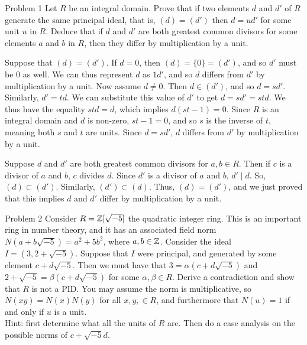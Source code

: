 \documentclass{hmwk}
\begin{document}
\maketitle

\begin{problem}{Problem 1}
Let $R$ be an integral domain. Prove that if two elements $d$ and $d'$ of $R$ generate the same principal ideal, that is, $(d) = (d')$ then $d = ud'$ for some unit $u$ in $R$. Deduce that if $d$ and $d'$ are both greatest common divisors for some elements $a$ and $b$ in $R$, then they differ by multiplication by a unit.
\end{problem}

\begin{solution}

\pre Suppose that $(d) = (d')$. If $d = 0$, then $(d) = \{0\} = (d')$, and so $d'$ must be $0$ as well. We can thus represent $d$ as $1d'$, and so $d$ differs from $d'$ by multiplication by a unit. Now assume $d \neq 0$. Then $d \in (d')$, and so $d = sd'$. Similarly, $d' = td$. We can substitute this value of $d'$ to get $d = sd' = std$. We thus have the equality $std = d$, which implies $d(st - 1) = 0$. Since $R$ is an integral domain and $d$ is non-zero, $st - 1 = 0$, and so $s$ is the inverse of $t$, meaning both $s$ and $t$ are units. Since $d = sd'$, $d$ differs from $d'$ by multiplication by a unit. 

\pre Suppose $d$ and $d'$ are both greatest common divisors for $a, b \in R$. Then if $c$ is a divisor of $a$ and $b$, $c$ divides $d$. Since $d'$ is a divisor of $a$ and $b$, $d' \mid d$. So, $(d) \subset (d')$. Similarly, $(d') \subset (d)$. Thus, $(d) = (d')$, and we just proved that this implies $d$ and $d'$ differ by multiplication by a unit.

\end{solution}

\begin{problem}{Problem 2}
Consider $R = \mathbb{Z}[\sqrt{-5}]$ the quadratic integer ring. This is an important ring in number theory, and it has an associated field norm $N(a+b\sqrt{-5}) = a^2+5 b^2$, where $a, b \in \mathbb{Z}$.  Consider the ideal $I = (3, 2+ \sqrt{-5})$. Suppose that $I$ were principal, and generated by some element $c+d\sqrt{-5}$. 
Then we must have that $3= \alpha (c+d\sqrt{-5})$ and $2+\sqrt{-5} = \beta(c+d \sqrt{-5})$ for some $\alpha, \beta \in R$. 
Derive a contradiction and show that $R$ is not a PID.
You may assume the norm is multiplicative, so $N(xy) = N(x)N(y)$ for all $x, y, \in R$, and furthermore that $N(u) = 1$ if and only if $u$ is a unit. 
\\ Hint: first determine what all the units of $R$ are. Then do a case analysis on the possible norms of $c+ \sqrt{-5} d$.  
\end{problem}
\end{document}
